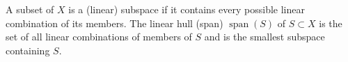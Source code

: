 A subset of $X$ is a (linear) subspace if it contains every possible linear combination of its members. The linear hull (span) $\operatorname{span}(S)$ of $S \subset X$ is the set of all linear combinations of members of $S$ and is the smallest subspace containing $S$.